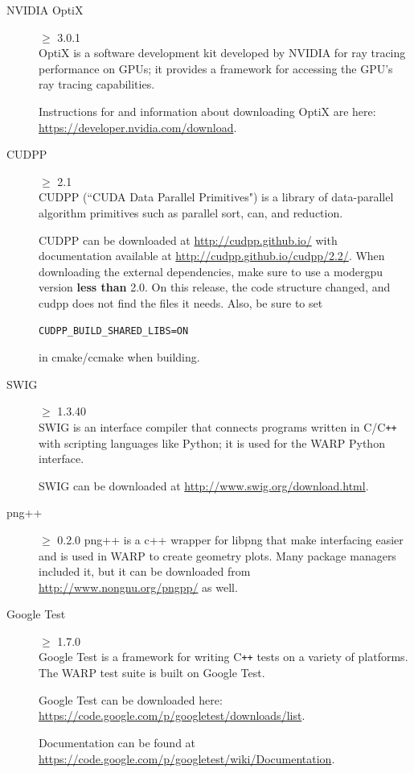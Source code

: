 \documentclass[twoside,a4paper]{refart}
\begin{document}
\begin{description}
\item[NVIDIA OptiX]$\ge$ 3.0.1 \\
OptiX is a software development kit developed by NVIDIA for ray tracing performance on GPUs; it provides a
framework for accessing the GPU's ray tracing capabilities.

Instructions for and information about downloading OptiX are here: \url{https://developer.nvidia.com/download}.

\item[CUDPP]$\ge$ 2.1 \\
CUDPP (``CUDA Data Parallel Primitives") is a library of data-parallel algorithm primitives such as 
parallel sort, can, and reduction.

CUDPP can be downloaded at \url{http://cudpp.github.io/} with documentation available at 
\url{http://cudpp.github.io/cudpp/2.2/}.  When downloading the external dependencies, make sure to use a modergpu version {\bf less than} 2.0.  On this release, the code structure changed, and cudpp does not find the files it needs.  Also, be sure to set \begin{verbatim}CUDPP_BUILD_SHARED_LIBS=ON\end{verbatim} in cmake/ccmake when building.

\item[SWIG]$\ge$ 1.3.40 \\
SWIG is an interface compiler that connects programs written in C/C\texttt{++} with scripting languages
like Python; it is used for the WARP Python interface.

SWIG can be downloaded at \url{http://www.swig.org/download.html}.

\item[png++] $\ge$ 0.2.0
png++ is a c++ wrapper for libpng that make interfacing easier and is used in WARP to create geometry plots. Many package managers included it, but it can be downloaded from \url{http://www.nongnu.org/pngpp/} as well.

\item[Google Test]$\ge$ 1.7.0 \\
Google Test is a framework for writing C\texttt{++} tests on a variety of platforms. The WARP test suite
is built on Google Test.

Google Test can be downloaded here: \url{https://code.google.com/p/googletest/downloads/list}.

Documentation can be found at \url{https://code.google.com/p/googletest/wiki/Documentation}.


\end{description}
\end{document}
